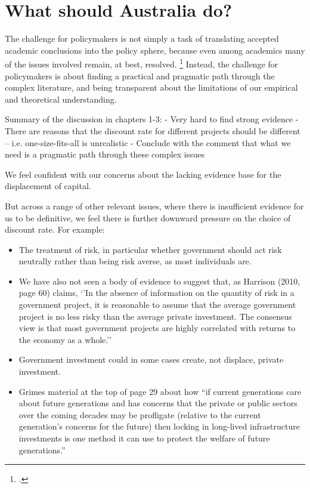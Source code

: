 \chapter{What should Australia do?}\label{chap:what-should-Australia-do}

The challenge for policymakers is not simply a task of translating accepted academic conclusions into the policy sphere, because even among academics many of the issues involved remain, at best, resolved.%
    \footcite[][24]{Grimes-Beyond-Simple-CBA}
Instead, the challenge for policymakers is about finding a practical and pragmatic path through the complex literature, and being transparent about the limitations of our empirical and theoretical understanding.

Summary of the discussion in chapters 1-3:
- Very hard to find strong evidence
- There are reasons that the discount rate for different projects should be different -- i.e. one-size-fits-all is unrealistic
- Conclude with the comment that what we need is a pragmatic path through these complex issues

We feel confident with our concerns about the lacking evidence base for the displacement of capital. 

But across a range of other relevant issues, where there is insufficient evidence for us to be definitive, we feel there is further downward pressure on the choice of discount rate. For example:
\begin{itemize}
    \item The treatment of risk, in particular whether government should act risk neutrally rather than being risk averse, as most individuals are. 
    \item We have also not seen a body of evidence to suggest that, as Harrison (2010, page 60) claims, `'In the absence of information on the quantity of risk in a government project, it is reasonable to assume that the average government project is no less risky than the average private investment. The consensus view is that most government projects are highly correlated with returns to the economy as a whole.'' 
    \item Government investment could in some cases create, not displace, private investment. 
    \item Grimes material at the top of page 29 about how ``if current generations care about future generations and has concerns that the private or public sectors over the coming decades may be profligate (relative to the current generation's concerns for the future) then locking in long-lived infrastructure investments is one method it can use to protect the welfare of future generations.''
\end{itemize}

